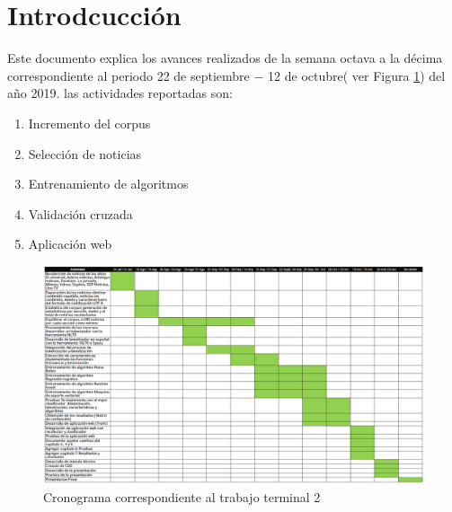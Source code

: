 \section{Introdcucción}

Este documento explica los avances realizados de la semana octava a  la décima correspondiente al periodo 22 de septiembre $-$ 12 de octubre( ver Figura \ref{fig:cronograma}) del año 2019. las actividades reportadas son:

\begin{enumerate}
	\item Incremento del corpus
	\item Selección de noticias
	\item Entrenamiento de algoritmos
	\item Validación cruzada
	\item Aplicación web
\end{enumerate} 

\begin{figure}[ht]
\centering
\includegraphics[scale=0.4]{imagenes/Cronograma.png}
\caption{Cronograma correspondiente al trabajo terminal 2}
\label{fig:cronograma}
\end{figure}

